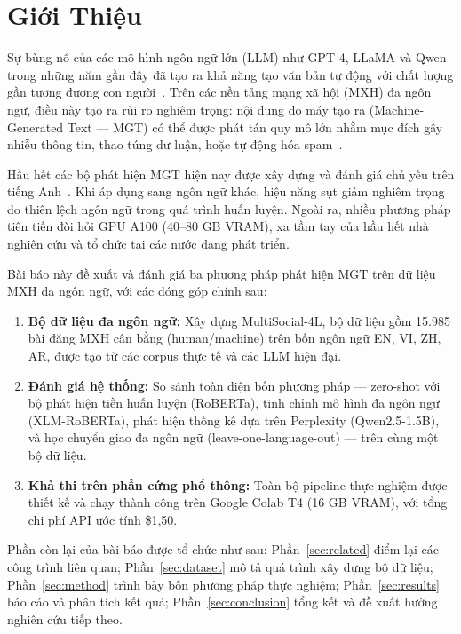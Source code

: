 
\section{Giới Thiệu}
\label{sec:intro}

Sự bùng nổ của các mô hình ngôn ngữ lớn (LLM) như GPT-4, LLaMA và
Qwen trong những năm gần đây đã tạo ra khả năng tạo văn bản tự động
với chất lượng gần tương đương con người~\cite{brown2020gpt3,
touvron2023llama}. Trên các nền tảng mạng xã hội (MXH) đa ngôn ngữ,
điều này tạo ra rủi ro nghiêm trọng: nội dung do máy tạo ra (Machine-Generated
Text --- MGT) có thể được phát tán quy mô lớn nhằm mục đích gây nhiễu
thông tin, thao túng dư luận, hoặc tự động hóa spam~\cite{zellers2019grover}.

Hầu hết các bộ phát hiện MGT hiện nay được xây dựng và đánh giá chủ
yếu trên tiếng Anh~\cite{solaiman2019gpt2detector,mitchell2023detectgpt}.
Khi áp dụng sang ngôn ngữ khác, hiệu năng sụt giảm nghiêm trọng do
thiên lệch ngôn ngữ trong quá trình huấn luyện. Ngoài ra, nhiều phương
pháp tiên tiến đòi hỏi GPU A100 (40--80 GB VRAM), xa tầm tay của hầu
hết nhà nghiên cứu và tổ chức tại các nước đang phát triển.

Bài báo này đề xuất và đánh giá ba phương pháp phát hiện MGT trên
dữ liệu MXH đa ngôn ngữ, với các đóng góp chính sau:

\begin{enumerate}
    \item \textbf{Bộ dữ liệu đa ngôn ngữ:} Xây dựng MultiSocial-4L, bộ
          dữ liệu gồm 15.985 bài đăng MXH cân bằng (human/machine) trên bốn
          ngôn ngữ EN, VI, ZH, AR, được tạo từ các corpus thực tế và các LLM
          hiện đại.

    \item \textbf{Đánh giá hệ thống:} So sánh toàn diện bốn phương pháp ---
          zero-shot với bộ phát hiện tiền huấn luyện (RoBERTa), tinh chỉnh
          mô hình đa ngôn ngữ (XLM-RoBERTa), phát hiện thống kê dựa trên
          Perplexity (Qwen2.5-1.5B), và học chuyển giao đa ngôn ngữ
          (leave-one-language-out) --- trên cùng một bộ dữ liệu.

    \item \textbf{Khả thi trên phần cứng phổ thông:} Toàn bộ pipeline
          thực nghiệm được thiết kế và chạy thành công trên Google Colab T4
          (16 GB VRAM), với tổng chi phí API ước tính \$1,50.
\end{enumerate}

Phần còn lại của bài báo được tổ chức như sau: Phần~\ref{sec:related}
điểm lại các công trình liên quan; Phần~\ref{sec:dataset} mô tả quá
trình xây dựng bộ dữ liệu; Phần~\ref{sec:method} trình bày bốn phương
pháp thực nghiệm; Phần~\ref{sec:results} báo cáo và phân tích kết quả;
Phần~\ref{sec:conclusion} tổng kết và đề xuất hướng nghiên cứu tiếp theo.
